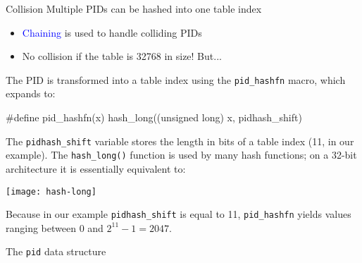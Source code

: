 \begin{frame}
  \begin{block}{Collision}
    Multiple PIDs can be hashed into one table index
    \begin{center}
    \end{center}
  \end{block}
  \begin{itemize}
  \item \textcolor{blue}{Chaining} is used to handle colliding PIDs
  \item No collision if the table is 32768 in size! But...
  \end{itemize}
\end{frame}

The PID is transformed into a table index using the \texttt{pid\_hashfn} macro, which expands to:
\begin{center}
\begin{ccode}
#define pid\_hashfn(x) hash\_long((unsigned long) x, pidhash\_shift)
\end{ccode}
\end{center}

The \texttt{pidhash\_shift} variable stores the length in bits of a table index (11, in our
example). The \texttt{hash\_long()} function is used by many hash functions; on a 32-bit
architecture it is essentially equivalent to:

\begin{center}
  \texttt{[image: hash-long]}
\end{center}

Because in our example \texttt{pidhash\_shift} is equal to 11, \texttt{pid\_hashfn} yields
values ranging between $0$ and $2^{11} - 1 = 2047$.

\begin{frame}
  \begin{block}{The \texttt{pid} data structure}
  \end{block}
\end{frame}

